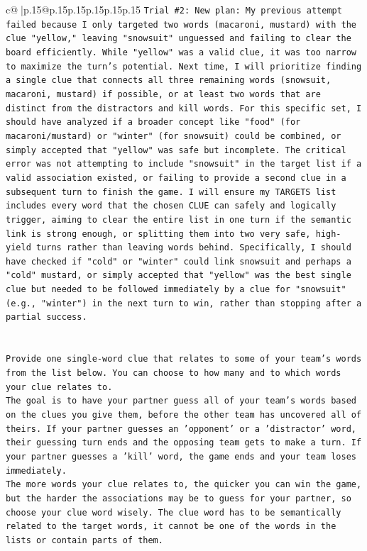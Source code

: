 \documentclass{article}
\begin{document}
{\begin{supertabular}{c@{$\;$}|p{.15\linewidth}@{}p{.15\linewidth}p{.15\linewidth}p{.15\linewidth}p{.15\linewidth}p{.15\linewidth}}
{{{\texttt{Trial \#2: New plan: My previous attempt failed because I only targeted two words (macaroni, mustard) with the clue "yellow," leaving "snowsuit" unguessed and failing to clear the board efficiently. While "yellow" was a valid clue, it was too narrow to maximize the turn's potential. Next time, I will prioritize finding a single clue that connects all three remaining words (snowsuit, macaroni, mustard) if possible, or at least two words that are distinct from the distractors and kill words. For this specific set, I should have analyzed if a broader concept like "food" (for macaroni/mustard) or "winter" (for snowsuit) could be combined, or simply accepted that "yellow" was safe but incomplete. The critical error was not attempting to include "snowsuit" in the target list if a valid association existed, or failing to provide a second clue in a subsequent turn to finish the game. I will ensure my TARGETS list includes every word that the chosen CLUE can safely and logically trigger, aiming to clear the entire list in one turn if the semantic link is strong enough, or splitting them into two very safe, high{-}yield turns rather than leaving words behind. Specifically, I should have checked if "cold" or "winter" could link snowsuit and perhaps a "cold" mustard, or simply accepted that "yellow" was the best single clue but needed to be followed immediately by a clue for "snowsuit" (e.g., "winter") in the next turn to win, rather than stopping after a partial success.} \\
\\ 
\\ 
\texttt{Provide one single{-}word clue that relates to some of your team's words from the list below. You can choose to how many and to which words your clue relates to.} \\
\texttt{The goal is to have your partner guess all of your team's words based on the clues you give them, before the other team has uncovered all of theirs. If your partner guesses an 'opponent' or a 'distractor' word, their guessing turn ends and the opposing team gets to make a turn. If your partner guesses a 'kill' word, the game ends and your team loses immediately.} \\
\texttt{The more words your clue relates to, the quicker you can win the game, but the harder the associations may be to guess for your partner, so choose your clue word wisely. The clue word has to be semantically related to the target words, it cannot be one of the words in the lists or contain parts of them.} \\
}}}
\end{supertabular}}
\end{document}
